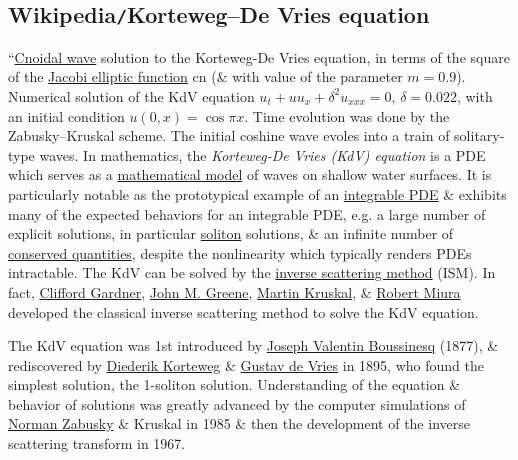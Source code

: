 \documentclass{article}
\begin{document}

\subsection{Wikipedia{\tt/}Korteweg--De Vries equation}
``{\sf\href{https://en.wikipedia.org/wiki/Cnoidal_wave}{Cnoidal wave} solution to the Korteweg-De Vries equation, in terms of the square of the \href{https://en.wikipedia.org/wiki/Jacobi_elliptic_function}{Jacobi elliptic function} cn (\& with value of the parameter $m = 0.9$). Numerical solution of the KdV equation $u_t + uu_x + \delta^2u_{xxx} = 0$, $\delta = 0.022$, with an initial condition $u(0,x) = \cos\pi x$. Time evolution was done by the Zabusky--Kruskal scheme. The initial coshine wave evoles into a train of solitary-type waves.} In mathematics, the {\it Korteweg-De Vries (KdV) equation} is a PDE which serves as a \href{https://en.wikipedia.org/wiki/Mathematical_model}{mathematical model} of waves on shallow water surfaces. It is particularly notable as the prototypical example of an \href{https://en.wikipedia.org/wiki/Integrable_system}{integrable PDE} \& exhibits many of the expected behaviors for an integrable PDE, e.g. a large number of explicit solutions, in particular \href{https://en.wikipedia.org/wiki/Soliton}{soliton} solutions, \& an infinite number of \href{https://en.wikipedia.org/wiki/Conserved_quantities}{conserved quantities}, despite the nonlinearity which typically renders PDEs intractable. The KdV can be solved by the \href{https://en.wikipedia.org/wiki/Inverse_scattering_transform}{inverse scattering method} (ISM). In fact, \href{https://en.wikipedia.org/wiki/Clifford_Gardner}{\sc Clifford Gardner}, \href{https://en.wikipedia.org/wiki/John_M._Greene}{\sc John M. Greene}, \href{https://en.wikipedia.org/wiki/Martin_Kruskal}{\sc Martin Kruskal}, \& \href{https://en.wikipedia.org/wiki/Robert_Miura}{\sc Robert Miura} developed the classical inverse scattering method to solve the KdV equation.

The KdV equation was 1st introduced by \href{https://en.wikipedia.org/wiki/Joseph_Valentin_Boussinesq}{\sc Joseph Valentin Boussinesq} (1877), \& rediscovered by \href{https://en.wikipedia.org/wiki/Diederik_Korteweg}{Diederik Korteweg} \& \href{https://en.wikipedia.org/wiki/Gustav_de_Vries}{Gustav de Vries} in 1895, who found the simplest solution, the 1-soliton solution. Understanding of the equation \& behavior of solutions was greatly advanced by the computer simulations of \href{https://en.wikipedia.org/wiki/Norman_Zabusky}{\sc Norman Zabusky} \& Kruskal in 1985 \& then the development of the inverse scattering transform in 1967.
\end{document}
